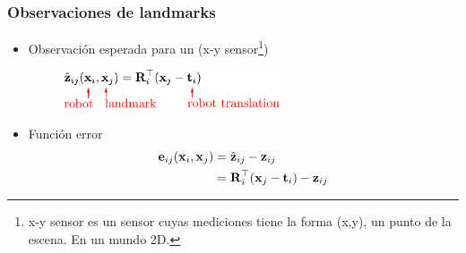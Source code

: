 \begin{frame}
    \frametitle{Observaciones de landmarks}
    
    \vspace{4em}
    \begin{itemize}
        \item Observación esperada para un (x-y sensor\footnote{x-y sensor es un sensor cuyas mediciones tiene la forma (x,y), un punto de la escena. En un mundo 2D.})
           \begin{figure}[!h]
            \includegraphics[width=0.6\textwidth]{images/pose_landmark_graph_expected_observation.pdf}
        \end{figure}
    \item Función error
    \begin{align*}
        \boldsymbol{\mathbf{e}}_{ij}(\boldsymbol{\mathbf{x}}_{i}, \boldsymbol{\mathbf{x}}_{j}) &= \hat{\boldsymbol{\mathbf{z}}}_{ij} - \boldsymbol{\mathbf{z}}_{ij}\\
                    &= \boldsymbol{\mathbf{R}}_{i}^{\top}(\boldsymbol{\mathbf{x}}_{j}-\boldsymbol{\mathbf{t}}_{i}) - \boldsymbol{\mathbf{z}}_{ij}
    \end{align*}
    \end{itemize}
    
\end{frame}

